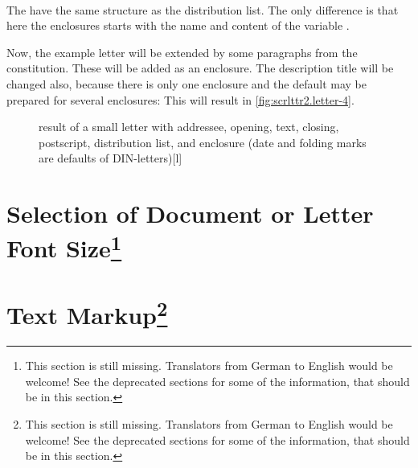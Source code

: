 \begin{Declaration}
  \\
\end{Declaration}
%
%
The  have the same structure as the distribution list.
The only difference is that here the enclosures starts with the name
and content of the variable
.
\begin{Example}
  Now, the example letter will be extended by some paragraphs from the
  constitution. These will be added as an enclosure. The description title
  will be changed also, because there is only one enclosure and the default
  may be prepared for several enclosures:
  This will result in \autoref{fig:scrlttr2.letter-4}.
  \begin{figure}
    \setcapindent{0pt}%
    \begin{captionbeside}{%
        result of a small letter with addressee, opening, text, closing,
        postscript, distribution list, and enclosure
        (date and folding marks are defaults of DIN-letters)}[l]
    \end{captionbeside}
    \label{fig:scrlttr2.letter-4}
  \end{figure}
\end{Example}
%
%
%
%


\section{Selection of Document or Letter Font Size\protect\footnote{This section is still missing. Translators
    from German to English would be welcome! See the deprecated sections for
    some of the information, that should be in this section.}}
\label{sec:scrlttr2.stillmissing}
\mbox{}

\section{Text Markup\protect\footnote{This section is still missing. Translators
    from German to English would be welcome! See the deprecated sections for
    some of the information, that should be in this section.}}
\label{sec:scrlttr2.stillmissing}
\mbox{}

